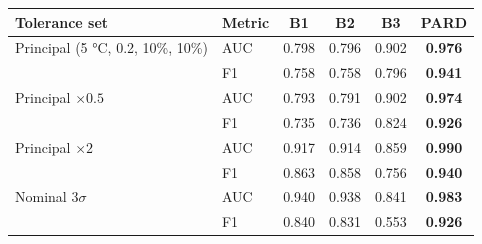 \begin{tabular}{llcccc}
\toprule
Tolerance set & Metric & B1 & B2 & B3 & PARD \\
\midrule
Principal (5 \si{\celsius}, 0.2, 10\%, 10\%) & AUC & 0.798 & 0.796 & 0.902 & \textbf{0.976} \\
 & F1 & 0.758 & 0.758 & 0.796 & \textbf{0.941} \\
Principal $\times0.5$ & AUC & 0.793 & 0.791 & 0.902 & \textbf{0.974} \\
 & F1 & 0.735 & 0.736 & 0.824 & \textbf{0.926} \\
Principal $\times2$ & AUC & 0.917 & 0.914 & 0.859 & \textbf{0.990} \\
 & F1 & 0.863 & 0.858 & 0.756 & \textbf{0.940} \\
Nominal $3\sigma$ & AUC & 0.940 & 0.938 & 0.841 & \textbf{0.983} \\
 & F1 & 0.840 & 0.831 & 0.553 & \textbf{0.926} \\
\bottomrule
\end{tabular}

